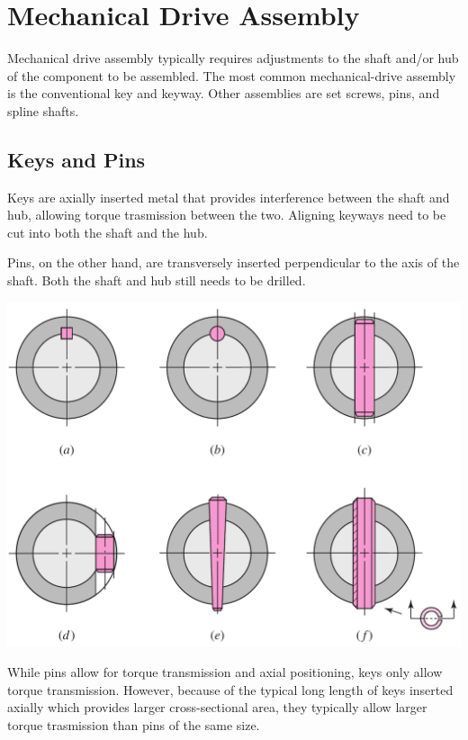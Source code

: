 \documentclass[a4paper,openany]{tufte-book}
\begin{document}
\section{Mechanical Drive Assembly}
\label{sec:org4ad857c}

Mechanical drive assembly typically requires adjustments to the shaft and/or hub of the component to be assembled. The most common mechanical-drive assembly is the conventional key and keyway. Other assemblies are set screws, pins, and spline shafts.

\subsection{Keys and Pins}
\label{sec:orga3edbd4}

Keys are axially inserted metal that provides interference between the shaft and hub, allowing torque trasmission between the two. Aligning keyways need to be cut into both the shaft and the hub.

Pins, on the other hand, are transversely inserted perpendicular to the axis of the shaft. Both the shaft and hub still needs to be drilled.

\begin{center}
\includegraphics[width=.9\linewidth]{./pictures/Shafts/keys-pins.png}
\end{center}

While pins allow for torque transmission and axial positioning, keys only allow torque transmission. However, because of the typical long length of keys inserted axially which provides larger cross-sectional area, they typically allow larger torque trasmission than pins of the same size.
\end{document}
